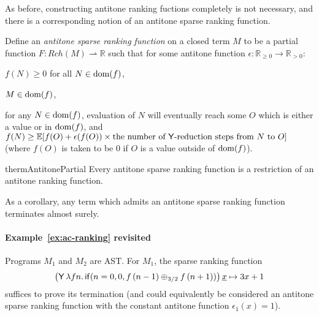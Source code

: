 As before, constructing antitone ranking fuctions completely is not necessary, and there is a corresponding notion of an antitone sparse ranking function.

\begin{definition}
Define an \emph{antitone sparse ranking function} on a closed term $M$ to be a partial function $F : Rch(M) \rightharpoonup \mathbb{R}$ such that for some antitone function $\epsilon : \mathbb{R}_{\geq 0} \to \mathbb{R}_{>0}$:
\begin{inparaenum}[(i)]
\item $f(N) \geq 0$ for all $N \in \operatorname{dom}(f)$,
\item $M \in \operatorname{dom}(f)$,
\item for any $N \in \operatorname{dom}(f)$, evaluation of $N$ will eventually reach some $O$ which is either a value or in $\operatorname{dom}(f)$, and $f(N) \geq \mathbb E [f(O) + \epsilon(f(O)) \times \text{the number of $\mathsf{Y}$-reduction steps from $N$ to $O$}]$ (where $f(O)$ is taken to be 0 if $O$ is a value outside of $\operatorname{dom}(f)$).
\end{inparaenum}
\end{definition}

\begin{restatable}{therm}{AntitonePartial}  \label{thm:antitone partial implies rankable}
  Every antitone sparse ranking function is a restriction of an antitone ranking function.
\end{restatable}

As a corollary, any term which admits an antitone sparse ranking function terminates almost surely.

\paragraph*{Example~\ref{ex:ac-ranking} revisited}
Programs $M_1$ and $M_2$ are AST. For $M_1$, the sparse ranking function 
\begin{align*}
\big(\mathsf{Y} \, \lambda f n . \, \mathsf{if}(n=0, 0, f \, (n-1) \oplus_{3/2} f \, (n+1))\big) \, \underline x \mapsto 3x + 1
\end{align*}
suffices to prove its termination (and could equivalently be considered an antitone sparse ranking function with the constant antitone function $\epsilon_1(x) = 1$).

